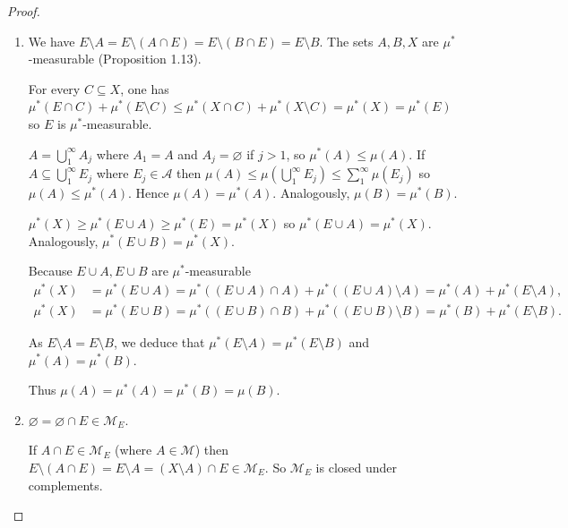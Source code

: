 \begin{proof}
    \begin{enumerate}[itemsep=0pt,label={\textbf{\alph*.}}]
        \item We have \( E \setminus A = E \setminus (A \cap E) = E \setminus (B \cap E) = E \setminus B \). The sets \( A, B, X \) are \( \mu^{\ast} \)-measurable (Proposition 1.13).

              For every \( C \subseteq X \), one has \( \mu^{\ast}(E \cap C) + \mu^{\ast}(E \setminus C) \le \mu^{\ast}(X \cap C) + \mu^{\ast}(X \setminus C) = \mu^{\ast}(X) = \mu^{\ast}(E) \) so \( E \) is \( \mu^{\ast} \)-measurable.

              \( A = \bigcup_{1}^{\infty} A_{j} \) where \( A_{1} = A \) and \( A_{j} = \varnothing \) if \( j > 1 \), so \( \mu^{\ast}(A) \le \mu(A) \). If \( A \subseteq \bigcup_{1}^{\infty} E_{j} \) where \( E_{j} \in \mathcal{A} \) then \( \mu(A) \le \mu\left(\bigcup_{1}^{\infty} E_{j}\right) \le \sum_{1}^{\infty} \mu(E_{j}) \) so \( \mu(A) \le \mu^{\ast}(A) \). Hence \( \mu(A) = \mu^{\ast}(A) \). Analogously, \( \mu(B) = \mu^{\ast}(B) \).

              \( \mu^{\ast}(X) \ge \mu^{\ast}(E \cup A) \ge \mu^{\ast}(E) = \mu^{\ast}(X) \) so \( \mu^{\ast}(E \cup A) = \mu^{\ast}(X) \). Analogously, \( \mu^{\ast}(E \cup B) = \mu^{\ast}(X) \).

              Because \( E \cup A, E \cup B \) are \( \mu^{\ast} \)-measurable
              \begingroup
              \allowdisplaybreaks
              \begin{align*}
                  \mu^{\ast}(X) & = \mu^{\ast}(E \cup A) = \mu^{\ast}((E \cup A) \cap A) + \mu^{\ast}((E \cup A) \setminus A) = \mu^{\ast}(A) + \mu^{\ast}(E \setminus A), \\
                  \mu^{\ast}(X) & = \mu^{\ast}(E \cup B) = \mu^{\ast}((E \cup B) \cap B) + \mu^{\ast}((E \cup B) \setminus B) = \mu^{\ast}(B) + \mu^{\ast}(E \setminus B).
              \end{align*}
              \endgroup

              As \( E \setminus A = E \setminus B \), we deduce that \( \mu^{\ast}(E \setminus A) = \mu^{\ast}(E \setminus B) \) and \( \mu^{\ast}(A) = \mu^{\ast}(B) \).

              Thus \( \mu(A) = \mu^{\ast}(A) = \mu^{\ast}(B) = \mu(B) \).
        \item \( \varnothing = \varnothing \cap E \in \mathcal{M}_{E} \).

              If \( A \cap E \in \mathcal{M}_{E} \) (where \( A \in \mathcal{M} \)) then \( E \setminus (A \cap E) = E \setminus A = (X \setminus A) \cap E \in \mathcal{M}_{E} \). So \( \mathcal{M}_{E} \) is closed under complements.


\end{enumerate}
\end{proof}
